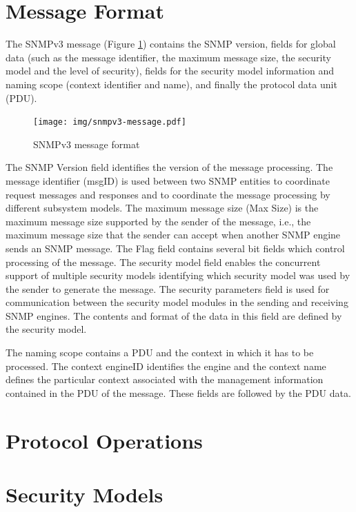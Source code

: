 \section{Message Format}
The SNMPv3 message (Figure \ref{fig:snmp-format}) contains the SNMP version, fields for global data (such as the message identifier, the maximum message size, the security model and the level of security), fields for the security model information and naming scope (context identifier and name), and finally the protocol data unit (PDU).
\begin{figure}[htp]	
\begin{center}
    \texttt{[image: img/snmpv3-message.pdf]}
    \caption{SNMPv3 message format}   
	\label{fig:snmp-format}
\end{center}
\end{figure}

The SNMP Version field identifies the version of the message processing. The message identifier (msgID) is used between two SNMP entities to coordinate request messages and responses and to coordinate the message processing by different subsystem models. The maximum message size (Max Size) is the maximum message size supported by the sender of the message, i.e., the maximum message size that the sender can accept when another SNMP engine sends an SNMP message. The Flag field contains several bit fields which control processing of the message. The security model field enables the concurrent support of multiple security models identifying which security model was used by the sender to generate the message. The security parameters field is used for communication between the security model modules in the sending and receiving SNMP engines. The contents and format of the data in this field are defined by the security model.

The naming scope contains a PDU and the context in which it has to be processed. The context engineID identifies the engine  and the context name defines the particular context associated with the management information contained in the PDU of the message. These fields are followed by the PDU data.



\section{Protocol Operations}

\section{Security Models}

